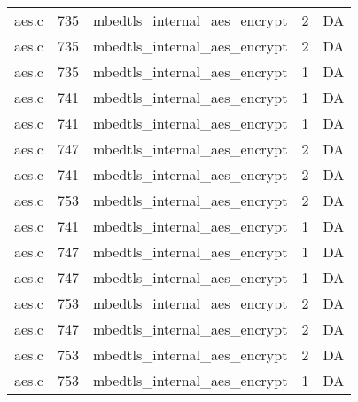 \begin{table*}
\begin{tabular}{clrrr}
aes.c&735&mbedtls\_internal\_aes\_encrypt&2 &DA\\
aes.c&735&mbedtls\_internal\_aes\_encrypt&2 &DA\\
aes.c&735&mbedtls\_internal\_aes\_encrypt&1 &DA\\
aes.c&741&mbedtls\_internal\_aes\_encrypt&1 &DA\\
aes.c&741&mbedtls\_internal\_aes\_encrypt&1 &DA\\
aes.c&747&mbedtls\_internal\_aes\_encrypt&2 &DA\\
aes.c&741&mbedtls\_internal\_aes\_encrypt&2 &DA\\
aes.c&753&mbedtls\_internal\_aes\_encrypt&2 &DA\\
aes.c&741&mbedtls\_internal\_aes\_encrypt&1 &DA\\
aes.c&747&mbedtls\_internal\_aes\_encrypt&1 &DA\\
aes.c&747&mbedtls\_internal\_aes\_encrypt&1 &DA\\
aes.c&753&mbedtls\_internal\_aes\_encrypt&2 &DA\\
aes.c&747&mbedtls\_internal\_aes\_encrypt&2 &DA\\
aes.c&753&mbedtls\_internal\_aes\_encrypt&2 &DA\\
aes.c&753&mbedtls\_internal\_aes\_encrypt&1 &DA\\
\hline
\end{tabular}
\end{table*}